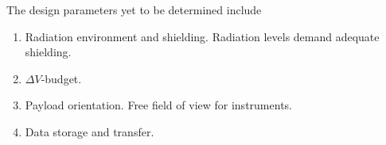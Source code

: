 The design parameters yet to be determined include

\begin{enumerate}
\item{Radiation environment and shielding.} Radiation levels demand adequate
  shielding.
\item{$\Delta V$-budget.}
\item{Payload orientation.} Free field of view for instruments.
\item{Data storage and transfer.}
\end{enumerate}

